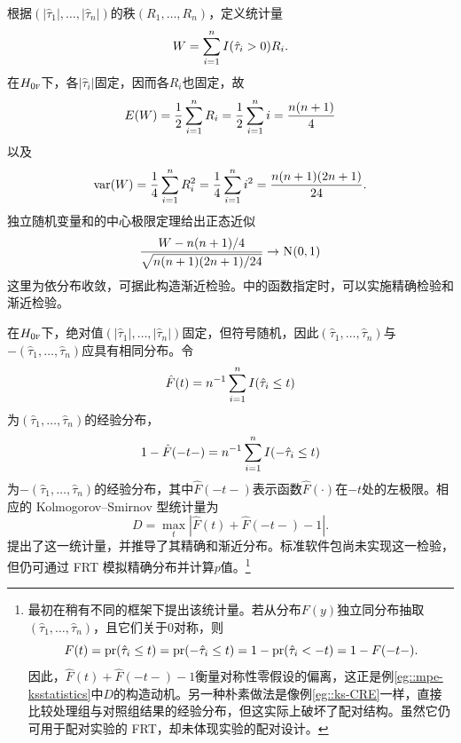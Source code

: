   \begin{example}
 [威尔科克森符号秩统计量]\label{eg::mpe-sign-rank}
根据$( | \hat{\tau}_1| , \ldots, | \hat{\tau}_n| )$的秩$(R_1, \ldots, R_n)$，定义统计量
$$
W = \sum_{i=1}^n  I( \hat{\tau}_i > 0 ) R_i. 
$$
在$H_{0\textsc{f}}$下，各$| \hat{\tau}_i|$固定，因而各$R_i$也固定，故
$$
E(W) = \frac{1}{2} \sum_{i=1}^n R_i = \frac{1}{2} \sum_{i=1}^n i = \frac{n(n+1)}{4}
$$
以及
$$
\textup{var}(W) = \frac{1}{4} \sum_{i=1}^n R_i^2 = \frac{1}{4} \sum_{i=1}^n i^2 = \frac{n(n+1)(2n+1)}{24}. 
$$
独立随机变量和的中心极限定理给出正态近似
$$
\frac{W - n(n+1)/4}{ \sqrt{n(n+1)(2n+1) / 24    } } \rightarrow \N01
$$
这里为依分布收敛，可据此构造渐近检验。中的函数指定时，可以实施精确检验和渐近检验。 
 \end{example}
 
 
 
 
   \begin{example}
 \label{eg::mpe-ksstatistics}
在$H_{0\textsc{f}}$下，绝对值$( | \hat{\tau}_1| , \ldots, | \hat{\tau}_n| )$固定，但符号随机，因此$   (  \hat{\tau}_1 , \ldots,  \hat{\tau}_n  )$与$ -   (  \hat{\tau}_1 , \ldots,  \hat{\tau}_n  )$应具有相同分布。令
$$
\hat{F}(t)  = n^{-1} \sum_{i=1}^n I( \hat{\tau}_i  \leq t  )
$$
为$  (  \hat{\tau}_1 , \ldots,  \hat{\tau}_n  )$的经验分布，
$$
1 - \hat{F}(-t-)  =    n^{-1} \sum_{i=1}^n I( -  \hat{\tau}_i  \leq t  )
$$
为$ -   (  \hat{\tau}_1 , \ldots,  \hat{\tau}_n  )$的经验分布，其中$\hat{F}(-t-)$表示函数$\hat{F}(\cdot)$在$-t$处的左极限。相应的 Kolmogorov--Smirnov 型统计量为
$$
D = \max_t |  \hat{F}(t)  +  \hat{F}(-t-)  - 1  |.
$$
\citet{butler1969test}提出了这一统计量，并推导了其精确和渐近分布。标准软件包尚未实现这一检验，但仍可通过 FRT 模拟精确分布并计算$p$值。\footnote{\citet{butler1969test}最初在稍有不同的框架下提出该统计量。若从分布$F(y)$独立同分布抽取$    (  \hat{\tau}_1 , \ldots,  \hat{\tau}_n  )$，且它们关于$0$对称，则
$$
F(t) = \textup{pr}( \hat{\tau}_i \leq t ) =  \textup{pr}( -  \hat{\tau}_i \leq t )  = 1 - \textup{pr}( \hat{\tau}_i <- t) = 1 - F(-t-).
$$
因此，$\hat{F}(t)  +  \hat{F}(-t-)  - 1 $衡量对称性零假设的偏离，这正是例\ref{eg::mpe-ksstatistics}中$D$的构造动机。另一种朴素做法是像例\ref{eg::ks-CRE}一样，直接比较处理组与对照组结果的经验分布，但这实际上破坏了配对结构。虽然它仍可用于配对实验的 FRT，却未体现实验的配对设计。}
 \end{example}
 
 
 
